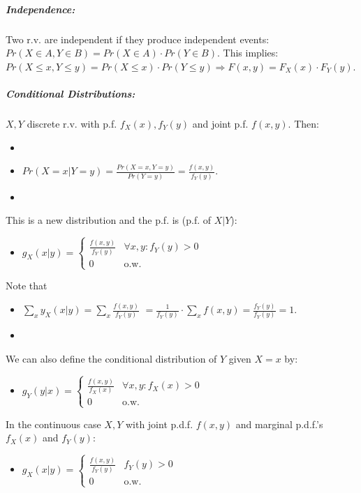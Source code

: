 \documentclass[landscape,10pt]{article}
\begin{document}
\begin{multicols}{3}
    \subparagraph*{Independence: }
        Two r.v. are independent if they produce independent events: $Pr(X \in A, Y \in B) = Pr(X \in A) \cdot Pr(Y \in B)$. This implies: $Pr(X \leq x, Y \leq y) = Pr(X \leq x) \cdot Pr(Y \leq y) \Rightarrow F(x,y) = F_X(x) \cdot F_Y(y)$.

    \subparagraph*{Conditional Distributions: }
        $X, Y$ discrete r.v. with p.f. $f_X(x), f_Y(y)$ and joint p.f. $f(x,y)$. Then:
        \begin{itemize}
            \item[]
            \item[] $Pr(X = x | Y = y) = \frac{Pr(X = x, Y = y)}{Pr(Y = y)} = \frac{f(x,y)}{f_Y(y)}$.
            \item[]
        \end{itemize}
        This is a new distribution and the p.f. is (p.f. of $X|Y$):
        \begin{itemize}
            \item[] $g_X(x|y) = \begin{cases} \frac{f(x,y)}{f_Y(y)} & \forall x,y: f_Y(y) > 0 \\ 0 & \text{o.w.}\end{cases}$
        \end{itemize}
        Note that 
        \begin{itemize}
            \item[]$\sum_x y_X(x|y) = \sum_x \frac{f(x,y)}{f_Y(y)} $
             $= \frac{1}{f_Y(y)} \cdot \sum_xf(x,y) = \frac{f_Y(y)}{f_Y(y)} = 1$. 
            \item[]
        \end{itemize}
    We can also define the conditional distribution of $Y$ given $X=x$ by:
        \begin{itemize}
            \item[] $g_Y(y|x) = \begin{cases} \frac{f(x,y)}{f_X(x)} & \forall x,y: f_X(x) > 0 \\ 0 & \text{o.w.} \end{cases}$
        \end{itemize}
    In the continuous case $X, Y$ with joint p.d.f. $f(x,y)$ and marginal p.d.f.'s $f_X(x)$ and $f_Y(y)$: 
\begin{itemize}
\item[] $g_X(x|y) = \begin{cases} \frac{f(x,y)}{f_Y(y)} & f_Y(y) > 0 \\ 0 & \text{o.w.} \end{cases} $

\end{itemize}
\end{multicols}
\end{document}
